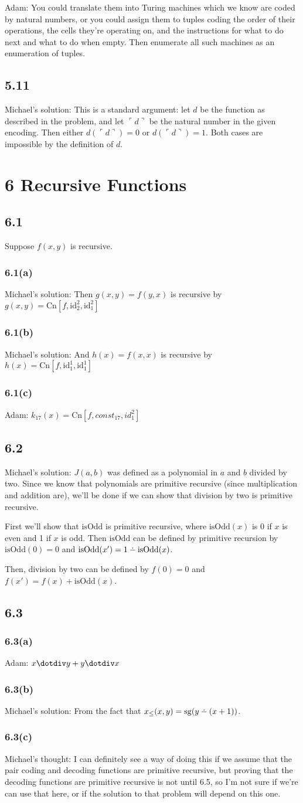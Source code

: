 \documentclass{article}
\newcommand\s{\section*}
\renewcommand\ss{\subsection*}
\newcommand\sss{\subsubsection*}
\newcommand\ms{Michael's solution: } %
\newcommand\mt{Michael's thought: } %
\begin{document}
Adam: You could translate them into Turing machines which we know are coded
by natural numbers, or you could assign them to tuples coding the order
of their operations, the cells they’re operating on, and the instructions for
what to do next and what to do when empty. Then enumerate all such
machines as an enumeration of tuples.
\ss{5.11}
\ms This is a standard argument: let $d$ be the function as described in the problem, and let $\ulcorner d\urcorner$ be the natural number in the given encoding.  Then either $d(\ulcorner d\urcorner) = 0$ or $d(\ulcorner d\urcorner) = 1$.  Both cases are impossible by the definition of $d$.

\s{6 Recursive Functions}
\newcommand\id{\mathrm{id}} %
\newcommand\Cn{\mathrm{Cn}} %
\renewcommand\Pr{\mathrm{Pr}} %
\newcommand\Mn{\mathrm{Mn}} %

\def\dotminus{\mathbin{\ooalign{\hss\raise1ex\hbox{.}\hss\cr
  \mathsurround=0pt$-$}}}

\ss{6.1}
Suppose $f(x,y)$ is recursive.
\sss{6.1(a)}
\ms Then $g(x,y) = f(y,x)$ is recursive by $g(x,y) = \Cn[f,\id^2_2,\id^2_1]$
\sss{6.1(b)}
\ms And $h(x) = f(x,x)$ is recursive by $h(x) = \Cn[f,\id^1_1,\id^1_1]$
\sss{6.1(c)} Adam: $k_{17}(x) = \Cn[f, const_{17}, id_1^2]$
\ss{6.2}
\ms $J(a,b)$ was defined as a polynomial in $a$ and $b$ divided by two.  Since we know that polynomials are primitive recursive (since multiplication and addition are), we'll be done if we can show that division by two is primitive recursive.

First we'll show that $\mathrm{isOdd}$ is primitive recursive, where $\mathrm{isOdd}(x)$ is 0 if $x$ is even and 1 if $x$ is odd.  Then $\mathrm{isOdd}$ can be defined by primitive recursion by $\mathrm{isOdd}(0) = 0$ and $\mathrm{isOdd}(x') = 1\dotminus\mathrm{isOdd}(x)$.

Then, division by two can be defined by $f(0) = 0$ and $f(x') = f(x) + \mathrm{isOdd}(x)$.
\ss{6.3}
\sss{6.3(a)} Adam: $x\dotdiv y + y\dotdiv x$
\sss{6.3(b)}
\ms From the fact that $x_{\leq}(x,y) = \mathrm{sg}(y\dotminus (x+1))$.
\sss{6.3(c)}
\mt I can definitely see a way of doing this if we assume that the pair coding and decoding functions are primitive recursive, but proving that the decoding functions are primitive recursive is not until 6.5, so I'm not sure if we're can use that here, or if the solution to that problem will depend on this one.
\end{document}
